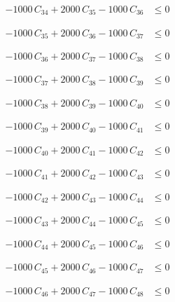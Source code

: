 \documentclass[a4paper,11pt]{article}
\begin{document}
\begin{align}
-1000\,C_{34} + 2000\,C_{35} - 1000\,C_{36} &\leq 0 \nonumber
\end{align}

\begin{align}
-1000\,C_{35} + 2000\,C_{36} - 1000\,C_{37} &\leq 0 \nonumber
\end{align}

\begin{align}
-1000\,C_{36} + 2000\,C_{37} - 1000\,C_{38} &\leq 0 \nonumber
\end{align}

\begin{align}
-1000\,C_{37} + 2000\,C_{38} - 1000\,C_{39} &\leq 0 \nonumber
\end{align}

\begin{align}
-1000\,C_{38} + 2000\,C_{39} - 1000\,C_{40} &\leq 0 \nonumber
\end{align}

\begin{align}
-1000\,C_{39} + 2000\,C_{40} - 1000\,C_{41} &\leq 0 \nonumber
\end{align}

\begin{align}
-1000\,C_{40} + 2000\,C_{41} - 1000\,C_{42} &\leq 0 \nonumber
\end{align}

\begin{align}
-1000\,C_{41} + 2000\,C_{42} - 1000\,C_{43} &\leq 0 \nonumber
\end{align}

\begin{align}
-1000\,C_{42} + 2000\,C_{43} - 1000\,C_{44} &\leq 0 \nonumber
\end{align}

\begin{align}
-1000\,C_{43} + 2000\,C_{44} - 1000\,C_{45} &\leq 0 \nonumber
\end{align}

\begin{align}
-1000\,C_{44} + 2000\,C_{45} - 1000\,C_{46} &\leq 0 \nonumber
\end{align}

\begin{align}
-1000\,C_{45} + 2000\,C_{46} - 1000\,C_{47} &\leq 0 \nonumber
\end{align}

\begin{align}
-1000\,C_{46} + 2000\,C_{47} - 1000\,C_{48} &\leq 0 \nonumber
\end{align}
\end{document}
